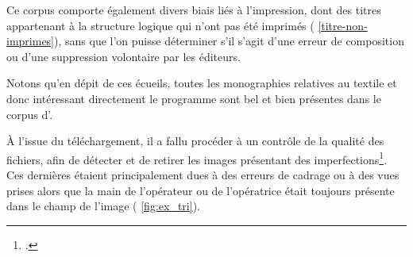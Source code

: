 Ce corpus comporte également divers biais liés à l'impression, dont des titres appartenant à la structure logique qui n'ont pas été imprimés (\ann{} \ref{titre-non-imprimes}), sans que l'on puisse déterminer s'il s'agit d'une erreur de composition ou d'une suppression volontaire par les éditeurs. 

Notons qu'en dépit de ces écueils, toutes les monographies relatives au textile et donc intéressant directement le programme \timeus{} sont bel et bien présentes dans le corpus d'\ia.

À l'issue du téléchargement, il a fallu procéder à un contrôle de la qualité des fichiers, afin de détecter et de retirer les images présentant des imperfections\footcite{chague2}. Ces dernières étaient principalement dues à des erreurs de cadrage ou à des vues prises alors que la main de l'opérateur ou de l'opératrice était toujours présente dans le champ de l'image (\fig{} \ref{fig:ex_tri}).

